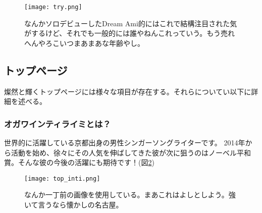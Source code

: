 \begin{figure}[H]
  \centering
  \texttt{[image: try.png]}
  \caption{なんかソロデビューしたDream Ami的にはこれで結構注目された気がするけど、それでも一般的には誰やねんこれっていう。もう売れへんやろこいつまあまあな年齢やし。}
\label{try}
\end{figure}

\newpage
\subsection{トップページ}

燦然と輝くトップページには様々な項目が存在する。それらについてい以下に詳細を述べる。

\subsubsection{オガワインティライミとは？}
世界的に活躍している京都出身の男性シンガーソングライターです。 2014年から活動を始め、徐々にその人気を伸ばしてきた彼が次に狙うのはノーベル平和賞。そんな彼の今後の活躍にも期待です！(図\ref{top_inti})\\

\begin{figure}[H]
  \centering
  \texttt{[image: top\_inti.png]}
  \caption{なんか一丁前の画像を使用している。まあこれはよしとしよう。強いて言うなら懐かしの名古屋。}
\label{top_inti}
\end{figure}


